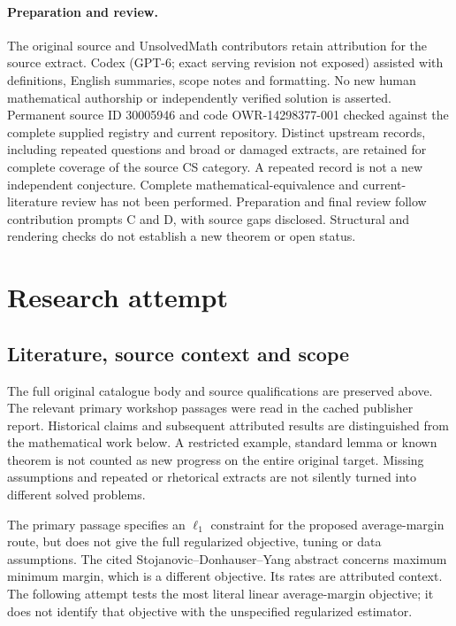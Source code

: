 \documentclass[11pt]{article}
\begin{document}
\paragraph{Preparation and review.}
The original source and UnsolvedMath contributors retain attribution for the source extract. Codex (GPT-6; exact serving revision not exposed) assisted with definitions, English summaries, scope notes and formatting. No new human mathematical authorship or independently verified solution is asserted. Permanent source ID 30005946 and code OWR-14298377-001 checked against the complete supplied registry and current repository. Distinct upstream records, including repeated questions and broad or damaged extracts, are retained for complete coverage of the source CS category. A repeated record is not a new independent conjecture. Complete mathematical-equivalence and current-literature review has not been performed. Preparation and final review follow contribution prompts C and D, with source gaps disclosed. Structural and rendering checks do not establish a new theorem or open status.
\label{end:30005946}

\section{Research attempt}
\subsection{Literature, source context and scope}
The full original catalogue body and source qualifications are preserved above. The relevant primary workshop passages were read in the cached publisher report. Historical claims and subsequent attributed results are distinguished from the mathematical work below. A restricted example, standard lemma or known theorem is not counted as new progress on the entire original target. Missing assumptions and repeated or rhetorical extracts are not silently turned into different solved problems.

The primary passage specifies an $\ell_1$ constraint for the proposed average-margin route, but does not give the full regularized objective, tuning or data assumptions. The cited Stojanovic--Donhauser--Yang abstract concerns maximum minimum margin, which is a different objective. Its rates are attributed context. The following attempt tests the most literal linear average-margin objective; it does not identify that objective with the unspecified regularized estimator.
\end{document}

